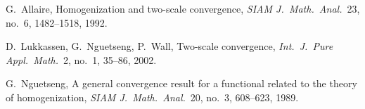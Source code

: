 \documentclass{jsarticle}
\theoremstyle{definition}
\theoremstyle{remark}
\numberwithin{equation}{section}
\begin{document}
% 
% 

\begin{thebibliography}{10}

G.~Allaire,
Homogenization and two-scale convergence,
\emph{SIAM J.\ Math.\ Anal.}\ 23, no.\ 6, 1482--1518,
1992.

D.~Lukkassen, G.~Nguetseng, P.~Wall,
Two-scale convergence,
\emph{Int.\ J.\ Pure Appl.\ Math.}\ 2, no.\ 1, 35--86,
2002.

G.~Nguetseng,
A general convergence result for a functional related to the theory of homogenization,
\emph{SIAM J.\ Math.\ Anal.}\ 20, no.\ 3, 608--623,
1989.

\end{thebibliography}
\end{document}
